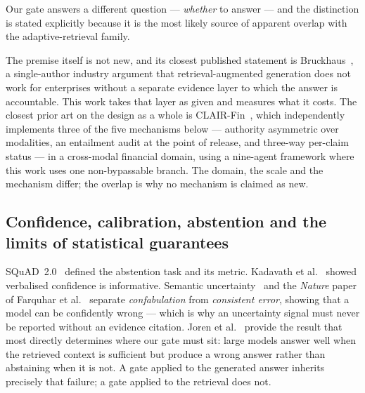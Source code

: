 \documentclass[preprint,3p,times]{elsarticle}
\begin{document}
Our gate answers a different question --- \emph{whether} to answer --- and the
distinction is stated explicitly because it is the most likely source of
apparent overlap with the adaptive-retrieval family.

The premise itself is not new, and its closest published statement is
Bruckhaus~\cite{bruckhaus2024ragenterprises}, a single-author industry
argument that retrieval-augmented generation does not work for enterprises
without a separate evidence layer to which the answer is accountable. This
work takes that layer as given and measures what it costs. The closest prior
art on the design as a whole is CLAIR-Fin~\cite{faria2026clairfin}, which
independently implements three of the five mechanisms below --- authority
asymmetric over modalities, an entailment audit at the point of release, and
three-way per-claim status --- in a cross-modal financial domain, using a
nine-agent framework where this work uses one non-bypassable branch. The
domain, the scale and the mechanism differ; the overlap is why no mechanism
is claimed as new.

\subsection{Confidence, calibration, abstention and the limits of statistical guarantees}

SQuAD~2.0~\cite{rajpurkar2018squad2} defined the abstention task and its
metric. Kadavath et al.~\cite{kadavath2022know} showed verbalised confidence
is informative. Semantic uncertainty~\cite{kuhn2023semantic} and the
\emph{Nature} paper of Farquhar et al.~\cite{farquhar2024semantic} separate
\emph{confabulation} from \emph{consistent error}, showing that a model can be
confidently wrong --- which is why an uncertainty signal must never be reported
without an evidence citation. Joren et al.~\cite{joren2024sufficient} provide
the result that most directly determines where our gate must sit: large models
answer well when the retrieved context is sufficient but produce a wrong answer
rather than abstaining when it is not. A gate applied to the generated answer
inherits precisely that failure; a gate applied to the retrieval does not.
\end{document}
